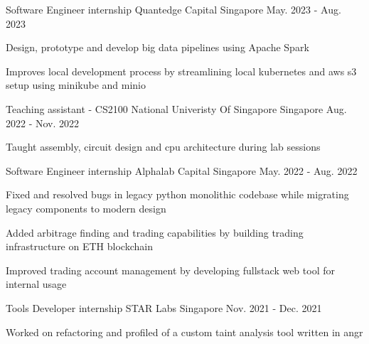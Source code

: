

\begin{cventries}

  \cventry
    {Software Engineer internship}
    {Quantedge Capital}
    {Singapore}
    {May. 2023 - Aug. 2023}
    {
        \begin{cvitems}
            \item {Design, prototype and develop big data pipelines using Apache Spark}
            \item {Improves local development process by streamlining local kubernetes and aws s3 setup using minikube and minio}
        \end{cvitems}
    }

  \cventry
    {Teaching assistant - CS2100}
    {National Univeristy Of Singapore}
    {Singapore}
    {Aug. 2022 - Nov. 2022}
    {
        \begin{cvitems}
            \item {Taught assembly, circuit design and cpu architecture during lab sessions}
        \end{cvitems}
    }

  \cventry
    {Software Engineer internship}
    {Alphalab Capital}
    {Singapore}
    {May. 2022 - Aug. 2022}
    {
        \begin{cvitems}
            \item {Fixed and resolved bugs in legacy python monolithic codebase while migrating legacy components to modern design}
            \item {Added arbitrage finding and trading capabilities by building trading infrastructure on ETH blockchain }
            \item {Improved trading account management by developing fullstack web tool for internal usage}
        \end{cvitems}
    }

  \cventry
    {Tools Developer internship} %
    {STAR Labs} %
    {Singapore} %
    {Nov. 2021 - Dec. 2021} %
    {
      \begin{cvitems} %
        \item {Worked on refactoring and profiled of a custom taint analysis tool written in angr}
      \end{cvitems}
    }


\end{cventries}
